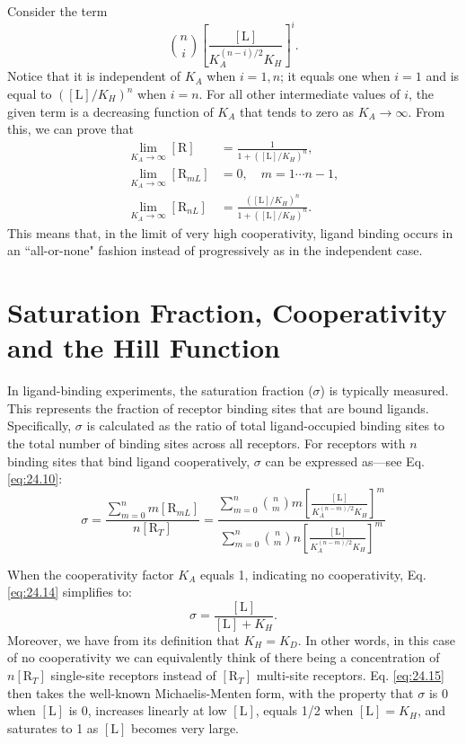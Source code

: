 Consider the term
\begin{equation*}
	\binom{n}{i}\left[\frac{[\text{L}]}{K_A^{(n-i)/2}K_H}\right]^i.
\end{equation*}
Notice that it is independent of $K_A$ when $i=1,n$; it equals one when $i=1$ and is equal to $([\text{L}]/K_H)^n$ when $i=n$. For all other intermediate values of $i$, the given term is a decreasing function of $K_A$ that tends to zero as $K_A \to \infty$. From this, we can prove that
\begin{align}
	\lim_{K_A \to \infty} [\text{R}] & = \frac{1}{1+([\text{L}]/K_H)^n}, \label{eq:24.11} \\
	\lim_{K_A \to \infty} [\text{R}_{mL}] & = 0, \quad m=1\cdots n-1, \label{eq:24.12} \\
	\lim_{K_A \to \infty} [\text{R}_{nL}] & = \frac{([\text{L}]/K_H)^n}{1+([\text{L}]/K_H)^n}. \label{eq:24.13}
\end{align} 
This means that, in the limit of very high cooperativity, ligand binding occurs in an ``all-or-none" fashion instead of progressively as in the independent case.

\section{Saturation Fraction, Cooperativity and the Hill Function}

In ligand-binding experiments, the saturation fraction ($\sigma$) is typically measured. This represents the fraction of receptor binding sites that are bound ligands. Specifically, $\sigma$ is calculated as the ratio of total ligand-occupied binding sites to the total number of binding sites across all receptors. For receptors with $n$ binding sites that bind ligand cooperatively, $\sigma$ can be expressed as---see Eq. \eqref{eq:24.10}:
\begin{equation}
	\sigma = \frac{\sum_{m=0}^n m [\text{R}_{mL}]}{n [\text{R}_T]} = \frac{\sum_{m=0}^n \binom{n}{m} m \left[\frac{[\text{L}]}{K_A^{(n-m)/2}K_H}\right]^m}{\sum_{m=0}^n \binom{n}{m} n \left[\frac{[\text{L}]}{K_A^{(n-m)/2}K_H}\right]^m}
	\label{eq:24.14}
\end{equation}

When the cooperativity factor $K_A$ equals 1, indicating no cooperativity, Eq. \eqref{eq:24.14} simplifies to:
\begin{equation}
	\sigma = \frac{[\text{L}]}{[\text{L}] + K_H}.
	\label{eq:24.15}
\end{equation}
Moreover, we have from its definition that $K_H = K_D$. In other words, in this case of no cooperativity we can equivalently think of there being a concentration of $n[\text{R}_T]$ single-site receptors instead of $[\text{R}_T]$ multi-site receptors. Eq. \eqref{eq:24.15} then takes the well-known Michaelis-Menten form, with the property that $\sigma$ is 0 when $[\text{L}]$ is 0, increases linearly at low $[\text{L}]$, equals 1/2 when $[\text{L}] = K_H$, and saturates to 1 as $[\text{L}]$ becomes very large.

